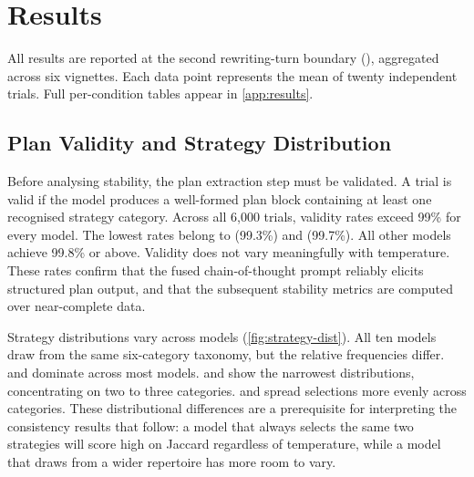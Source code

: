 \chapter{Results}
\label{chap:results}


All results are reported at the second rewriting-turn boundary
(), aggregated across six vignettes. Each data point
represents the mean of twenty independent trials. Full per-condition
tables appear in \autoref{app:results}.

\section{Plan Validity and Strategy Distribution}
\label{sec:res-validity}

Before analysing stability, the plan extraction step must be validated.
A trial is valid if the model produces a well-formed plan block containing
at least one recognised strategy category. Across all 6{,}000 trials,
validity rates exceed 99\% for every model. The lowest rates belong to
 (99.3\%) and  (99.7\%).
All other models achieve 99.8\% or above. Validity does not vary
meaningfully with temperature. These rates confirm that the fused
chain-of-thought prompt reliably elicits structured plan output, and that
the subsequent stability metrics are computed over near-complete data.


Strategy distributions vary across models (\autoref{fig:strategy-dist}).
All ten models draw from the same six-category taxonomy, but the relative
frequencies differ.  and 
dominate across most models.  and
 show the narrowest distributions, concentrating on
two to three categories.  and
 spread selections more evenly across categories.
These distributional differences are a prerequisite for interpreting the
consistency results that follow: a model that always selects the same two
strategies will score high on Jaccard regardless of temperature, while a
model that draws from a wider repertoire has more room to vary.

